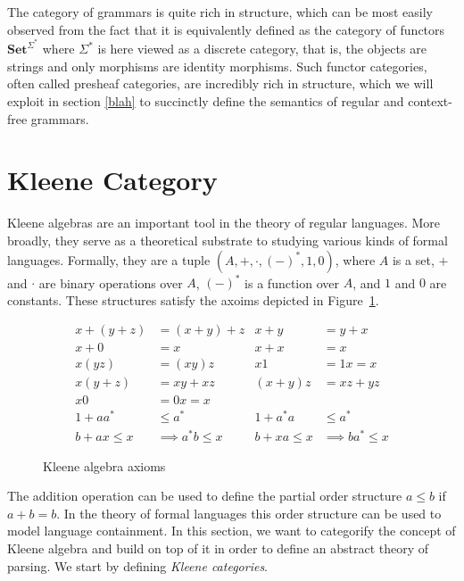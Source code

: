 \documentclass[sigconf,anonymous,review,screen]{acmart}
\newcommand{\Set}{\mathbf{Set}}
\newif\ifdraft
\newcommand{\steven}[1]{\ifdraft{\color{orange}[{\bf Steven}: #1]}\fi}
\begin{document}
The category of grammars is quite rich in structure, which can be most
easily observed from the fact that it is equivalently defined as the
category of functors $\Set^{\Sigma^*}$ where $\Sigma^*$ is here viewed
as a discrete category, that is, the objects are strings and only
morphisms are identity morphisms. Such functor categories, often
called presheaf categories, are incredibly rich in structure, which we
will exploit in section \ref{blah} to succinctly define the semantics
of regular and context-free grammars. \steven{Topoi model dependent type theory. This dependence is seemingly useful for also reasoning about context sensitivity, but this doesn't work for \textit{reasons}, right?}

\section{Kleene Category}

Kleene algebras are an important tool in the theory of regular
languages. More broadly, they serve as a theoretical substrate to
studying various kinds of formal languages. Formally, they are a tuple
$(A, +, \cdot, (-)^*, 1, 0)$, where $A$ is a set, $+$ and $\cdot$
are binary operations over $A$, $(-)^*$ is a function over $A$, and
$1$ and $0$ are constants. These structures satisfy the axoims depicted
in Figure~\ref{fig:axioms}.

\begin{figure}
  \begin{align*}
    x + (y + z) &= (x + y) + z & x + y &= y + x\\
    x + 0 &= x & x + x &= x\\
    x(yz) &= (xy)z & x1 &= 1x = x\\
    x(y + z) &= xy + xz & (x + y)z &= xz + yz\\
    x0 &= 0x = x & & \\
    1 + aa^* &\leq a^* & 1 + a^*a &\leq a^*\\
     b + ax \leq x &\implies a^*b \leq x &  b + xa \leq x &\implies ba^* \leq x
  \end{align*}
  \label{fig:axioms}
  \caption{Kleene algebra axioms}
\end{figure}

The addition operation can be used to define the partial order
structure $a \leq b$ if $a + b = b$. In the theory of formal languages
this order structure can be used to model language containment. In this
section, we want to categorify the concept of Kleene algebra and
build on top of it in order to define an abstract theory of parsing.
We start by defining \emph{Kleene categories}.
\end{document}
